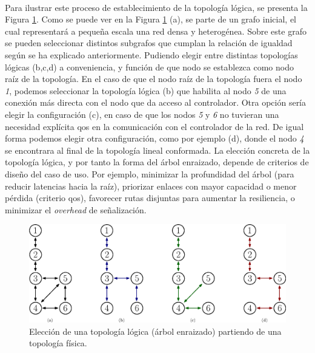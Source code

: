 \\
Para ilustrar este proceso de establecimiento de la topología lógica, se presenta la Figura \ref{fig:topo_logic_1}. Como se puede ver en la Figura \ref{fig:topo_logic_1} (a), se parte de un grafo inicial, el cual representará a pequeña escala una red densa y heterogénea. Sobre este grafo se pueden seleccionar distintos subgrafos que cumplan la relación de igualdad según se ha explicado anteriormente. Pudiendo elegir entre distintas topologías lógicas (b,c,d) a conveniencia, y función de que nodo se establezca como nodo raíz de la topología. En el caso de que el nodo raíz de la topología fuera el nodo \textit{1}, podemos seleccionar la topología lógica (b) que habilita al nodo \textit{5} de una conexión más directa con el nodo que da acceso al controlador. Otra opción sería elegir la configuración (c), en caso de que los nodos \textit{5} y \textit{6} no tuvieran una necesidad explícita \gls{qos} en la comunicación con el controlador de la red.  De igual forma podemos elegir otra configuración, como por ejemplo (d), donde el nodo \textit{4} se encontrara al final de la topología lineal conformada. La elección concreta de la topología lógica, y por tanto la forma del árbol enraizado, depende de criterios de diseño del caso de uso. Por ejemplo, minimizar la profundidad del árbol (para reducir latencias hacia la raíz), priorizar enlaces con mayor capacidad o menor pérdida (criterio \gls{qos}), favorecer rutas disjuntas para aumentar la resiliencia, o minimizar el \textit{overhead} de señalización. 

\begin{figure}[ht!]
   \centering
   \includegraphics[width=\textwidth]{fig/02_sota/sota_7_topo_logic_1.eps}
   \caption{Elección de una topología lógica (árbol enraizado) partiendo de una topología física.}
   \label{fig:topo_logic_1}
\end{figure}


